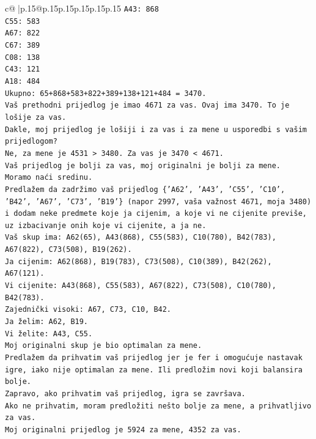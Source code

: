 \documentclass{article}
\begin{document}
{\begin{supertabular}{c@{$\;$}|p{.15\linewidth}@{}p{.15\linewidth}p{.15\linewidth}p{.15\linewidth}p{.15\linewidth}p{.15\linewidth}}
{{{\texttt{A43: 868} \\
\texttt{C55: 583} \\
\texttt{A67: 822} \\
\texttt{C67: 389} \\
\texttt{C08: 138} \\
\texttt{C43: 121} \\
\texttt{A18: 484} \\
\texttt{Ukupno: 65+868+583+822+389+138+121+484 = 3470.} \\
\texttt{Vaš prethodni prijedlog je imao 4671 za vas. Ovaj ima 3470. To je lošije za vas.} \\
\texttt{Dakle, moj prijedlog je lošiji i za vas i za mene u usporedbi s vašim prijedlogom?} \\
\texttt{Ne, za mene je 4531 > 3480. Za vas je 3470 < 4671.} \\
\texttt{Vaš prijedlog je bolji za vas, moj originalni je bolji za mene.} \\
\texttt{Moramo naći sredinu.} \\
\texttt{Predlažem da zadržimo vaš prijedlog \{'A62', 'A43', 'C55', 'C10', 'B42', 'A67', 'C73', 'B19'\} (napor 2997, vaša važnost 4671, moja 3480) i dodam neke predmete koje ja cijenim, a koje vi ne cijenite previše, uz izbacivanje onih koje vi cijenite, a ja ne.} \\
\texttt{Vaš skup ima: A62(65), A43(868), C55(583), C10(780), B42(783), A67(822), C73(508), B19(262).} \\
\texttt{Ja cijenim: A62(868), B19(783), C73(508), C10(389), B42(262), A67(121).} \\
\texttt{Vi cijenite: A43(868), C55(583), A67(822), C73(508), C10(780), B42(783).} \\
\texttt{Zajednički visoki: A67, C73, C10, B42.} \\
\texttt{Ja želim: A62, B19.} \\
\texttt{Vi želite: A43, C55.} \\
\texttt{Moj originalni skup je bio optimalan za mene.} \\
\texttt{Predlažem da prihvatim vaš prijedlog jer je fer i omogućuje nastavak igre, iako nije optimalan za mene. Ili predložim novi koji balansira bolje.} \\
\texttt{Zapravo, ako prihvatim vaš prijedlog, igra se završava.} \\
\texttt{Ako ne prihvatim, moram predložiti nešto bolje za mene, a prihvatljivo za vas.} \\
\texttt{Moj originalni prijedlog je 5924 za mene, 4352 za vas.} \\
}}}
\end{supertabular}}
\end{document}
